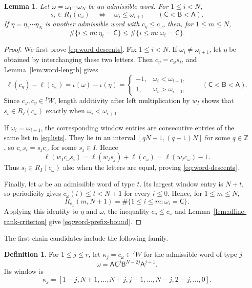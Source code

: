 \documentclass[11pt,a4paper,reqno]{amsart}
\numberwithin{equation}{section}
\newtheorem{lemma}[theorem]{Lemma}
\theoremstyle{definition}
\newtheorem{definition}[theorem]{Definition}
\theoremstyle{remark}
\theoremstyle{plain}
\newcommand{\A}{\mathsf A}
\newcommand{\B}{\mathsf B}
\newcommand{\CC}{\mathsf C}
\begin{document}
\begin{lemma}\label{lem:word-properties}
Let $\omega=\omega_1\cdots\omega_N$ be an admissible word.
For $1\leq i<N$,
\begin{equation}\label{eq:word-descents}
 s_i\in R_I(c_\omega)
 \quad\Longleftrightarrow\quad
 \omega_i\leq\omega_{i+1}\qquad(\CC<\B<\A).
\end{equation}
If $\eta = \eta_1 \cdots \eta_N$ is another admissible word with $c_\eta\leq c_\omega$,
then, for $1\leq m\leq N$,
\begin{equation}\label{eq:word-prefix-bound}
 \#\{i\leq m:\eta_i=\CC\}
 \leq\#\{i\leq m:\omega_i=\CC\}.
\end{equation}
\end{lemma}
\begin{proof}
We first prove \eqref{eq:word-descents}. Fix $1\leq i<N$.
If $\omega_i\ne\omega_{i+1}$, let $\eta$ be obtained by interchanging
these two letters. Then $c_\eta=c_\omega s_i$, and
Lemma~\ref{lem:word-length} gives
\[
 \ell(c_\eta)-\ell(c_\omega)
 =\iota(\omega)-\iota(\eta)
 =\begin{cases}
   -1,&\omega_i<\omega_{i+1},\\
    1,&\omega_i>\omega_{i+1},
  \end{cases}
 \qquad(\CC<\B<\A).
\]
Since $c_\omega,c_\eta\in{}^I W$, length additivity after left
multiplication by $w_I$ shows that $s_i\in R_I(c_\omega)$ exactly
when $\omega_i<\omega_{i+1}$.

If $\omega_i=\omega_{i+1}$, the corresponding window entries are
consecutive entries of the same list in \eqref{eq:lists}. They lie
in an interval $[qN+1,(q+1)N]$ for some $q\in\mathbb Z$, so
$c_\omega s_i=s_jc_\omega$ for some $s_j\in I$. Hence
\[
 \ell(w_Ic_\omega s_i)
 =\ell(w_Is_j)+\ell(c_\omega)
 =\ell(w_Ic_\omega)-1.
\]
Thus $s_i\in R_I(c_\omega)$ also when the letters are equal, proving
\eqref{eq:word-descents}.

Finally, let $\omega$ be an admissible word of type $t$. Its largest
window entry is $N+t$, so periodicity gives
$c_\omega(i)\leq t<N+1$ for every $i\leq0$. Hence, for
$1\leq m\leq N$,
\[
 R_{c_\omega}(m,N+1)
 =\#\{1\leq i\leq m:\omega_i=\CC\}.
\]
Applying this identity to $\eta$ and $\omega$, the inequality
$c_\eta\leq c_\omega$ and
Lemma~\ref{lem:affine-rank-criterion} give
\eqref{eq:word-prefix-bound}.
\end{proof}

The first-chain candidates include the following family.

\begin{definition}\label{def:kappa}
For $1\leq j\leq r$, let $\kappa_j=c_\omega\in{}^IW$ for the admissible
word of type $j$
\[
 \omega=\A\CC^j\B^{N-2j}\A^{j-1}.
\]
Its window is
\[
 \kappa_j=[1-j,N+1,\ldots,N+j,j+1,\ldots,N-j,2-j,\ldots,0].
\]
\end{definition}
\end{document}
